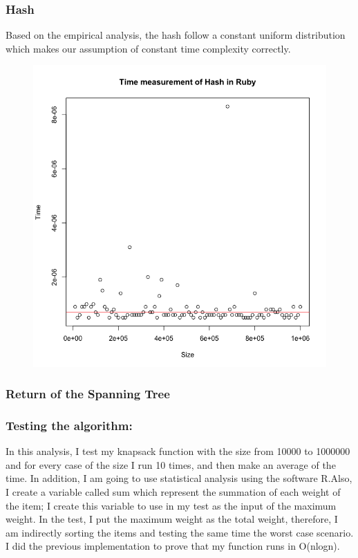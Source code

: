 \documentclass{article}
\begin{document}
\subsubsection{Hash}
Based on the empirical analysis, the hash follow a constant uniform distribution which makes our assumption of constant time complexity correctly.
\begin{figure}[H]
\centering
  \includegraphics[width=\linewidth]{Rplot2.png}
\end{figure}

\subsubsection{Return of the Spanning Tree}
\subsubsection{Testing the algorithm:}
In this analysis, I test my knapsack function with the size from 10000 to 1000000 and for every case of the size I run 10 times, and then make an average of the time. In addition, I am going to use statistical analysis using the software R.Also, I create a variable called sum which represent the summation of each weight of the item; I create this variable to use in my test as the input of the maximum weight. In the test, I put the maximum weight as the total weight, therefore, I am indirectly sorting the items and testing the same time the worst case scenario. I did the previous implementation to prove that my function runs in O(nlogn).
\end{document}
